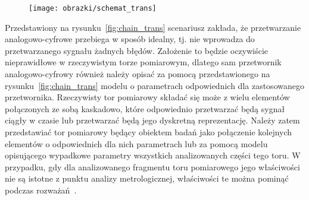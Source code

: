 \begin{figure}[htb!]
\begin{center}
\texttt{[image: obrazki/schemat\_trans]}
\end{center}
\end{figure}

Przedstawiony na rysunku~\ref{fig:chain_trans} scenariusz zakłada, że przetwarzanie analogowo-cyfrowe przebiega w sposób idealny, tj. nie wprowadza do przetwarzanego sygnału żadnych błędów. Założenie to będzie oczywiście nieprawidłowe w rzeczywistym torze pomiarowym, dlatego sam przetwornik analogowo-cyfrowy również należy opisać za pomocą przedstawionego na rysunku~\ref{fig:chain_trans} modelu o parametrach odpowiednich dla zastosowanego przetwornika. Rzeczywisty tor pomiarowy składać się może z wielu elementów połączonych ze sobą kaskadowo, które odpowiednio przetwarzać będą sygnał ciągły w czasie lub przetwarzać będą jego dyskretną reprezentację. Należy zatem przedstawiać tor pomiarowy będący obiektem badań jako połączenie kolejnych elementów o odpowiednich dla nich parametrach lub za pomocą modelu opisującego wypadkowe parametry wszystkich analizowanych części tego toru. W przypadku, gdy dla analizowanego fragmentu toru pomiarowego jego właściwości nie są istotne z punktu analizy metrologicznej, właściwości te można pominąć podczas rozważań~\cite{jcgm_guide}.

